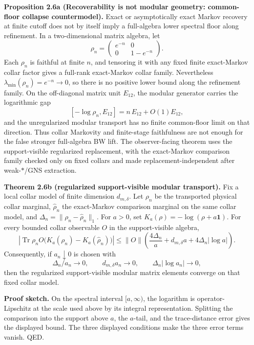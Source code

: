 \textbf{Proposition 2.6a (Recoverability is not modular geometry: common-floor collapse countermodel).} Exact or asymptotically exact Markov recovery at finite cutoff does not by itself imply a full-algebra lower spectral floor along refinement. In a two-dimensional matrix algebra, let
\[
\rho_n=\begin{pmatrix}e^{-n}&0\\0&1-e^{-n}\end{pmatrix}.
\]
Each \(\rho_n\) is faithful at finite \(n\), and tensoring it with any fixed finite exact-Markov collar factor gives a full-rank exact-Markov collar family. Nevertheless \(\lambda_{\min}(\rho_n)=e^{-n}\to0\), so there is no positive lower bound along the refinement family. On the off-diagonal matrix unit \(E_{12}\), the modular generator carries the logarithmic gap
\[
[ -\log\rho_n, E_{12} ] = n\,E_{12}+O(1)E_{12},
\]
and the unregularized modular transport has no finite common-floor limit on that direction. Thus collar Markovity and finite-stage faithfulness are not enough for the false stronger full-algebra BW lift. The observer-facing theorem uses the support-visible regularized replacement, with the exact-Markov comparison family checked only on fixed collars and made replacement-independent after weak-\(*\)/GNS extraction.

\textbf{Theorem 2.6b (regularized support-visible modular transport).} Fix a local collar model of finite dimension \(d_{m,\delta}\). Let \(\rho_n\) be the transported physical collar marginal, \(\widehat\rho_n\) the exact-Markov comparison marginal on the same collar model, and \(\Delta_n=\|\rho_n-\widehat\rho_n\|_1\). For \(a>0\), set \(K_a(\rho)=-\log(\rho+a\mathbf 1)\). For every bounded collar observable \(O\) in the support-visible algebra,
\[
\left|\operatorname{Tr}\rho_n O\bigl(K_a(\rho_n)-K_a(\widehat\rho_n)\bigr)\right|
\le
\|O\|\left(
  \frac{4\Delta_n}{a}
  + d_{m,\delta}a
  +4\Delta_n|\log a|
\right).
\]
Consequently, if \(a_n\downarrow0\) is chosen with
\[
\Delta_n/a_n\to0,\qquad
d_{m,\delta}a_n\to0,\qquad
\Delta_n|\log a_n|\to0,
\]
then the regularized support-visible modular matrix elements converge on that fixed collar model.

\textbf{Proof sketch.} On the spectral interval \([a,\infty)\), the logarithm is operator-Lipschitz at the scale used above by its integral representation. Splitting the comparison into the support above \(a\), the \(a\)-tail, and the trace-distance error gives the displayed bound. The three displayed conditions make the three error terms vanish. QED.

